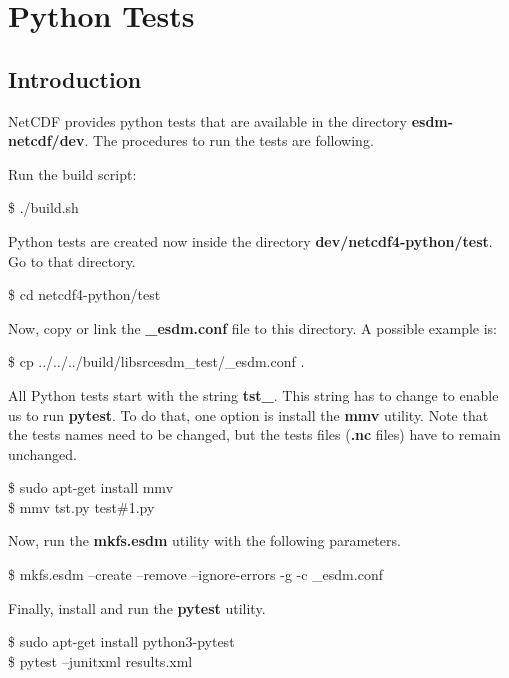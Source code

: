 \chapter{Python Tests}

\section{Introduction}

\tab
NetCDF provides python tests that are available in the directory \textbf{esdm-netcdf/dev}. The procedures to run the tests are following.

Run the build script:

\begin{framed}
\$ ./build.sh
\end{framed}

Python tests are created now inside the directory \textbf{dev/netcdf4-python/test}. Go to that directory.

\begin{framed}
\$ cd netcdf4-python/test
\end{framed}

Now, copy or link the \textbf{\_esdm.conf} file to this directory. A possible example is:

\begin{framed}
\$ cp ../../../build/libsrcesdm\_test/\_esdm.conf .
\end{framed}

All Python tests start with the string \textbf{tst\_}. This string has to change to enable us to run \textbf{pytest}. To do that, one option is install the \textbf{mmv} utility. Note that the tests names need to be changed, but the tests files (\textbf{.nc} files) have to remain unchanged.

\begin{framed}
\$ sudo apt-get install mmv\\
\$ mmv tst\*.py test\#1.py
\end{framed}

Now, run the \textbf{mkfs.esdm} utility with the following parameters.

\begin{framed}
\$ mkfs.esdm --create --remove --ignore-errors -g -c \_esdm.conf
\end{framed}

Finally, install and run the \textbf{pytest} utility.

\begin{framed}
\$ sudo apt-get install python3-pytest \\
\$ pytest --junitxml results.xml
\end{framed}

